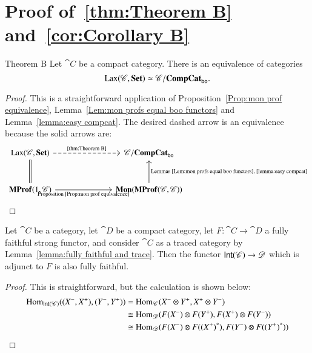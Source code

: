 \documentclass[12pt,oneside,article,draft]{memoir}
\begin{document}
\section{Proof of~\ref{thm:Theorem B} and~\ref{cor:Corollary B}}\label{sec:proof of Bs}

 \begin{named}{Theorem B}\label{thm:Theorem B}
 	Let $\cat{C}$ be a compact category. There is an equivalence of categories
  \[
    \operatorname{Lax}(\mathscr{C},\mathbf{Set})\simeq\mathscr{C}/\mathbf{CompCat}_{\mathsf{bo}}.
  \]
 \end{named}

\begin{proof}

This is a straightforward application of Proposition~\ref{Prop:mon prof equivalence}, Lemma~\ref{Lem:mon profs equal boo functors} and Lemma~\ref{lemma:easy compcat}. The desired dashed arrow is an equivalence because the solid arrows are:
$$
\begin{tikzcd}[column sep=2.5cm,row sep=1cm]
\Lax(\cat{C},\Set)\ar[d,equal]\ar[r,dashed,"\tn{\ref{thm:Theorem B}}"]&
\cat{C}/\CompCat_{\bo}\\
\MProf(1,\cat{C})\ar[r,"\tn{Proposition~\ref{Prop:mon prof equivalence}}"']&\Mon(\MProf(\cat{C},\cat{C}))\ar[u,"\tn{Lemmas~\ref{Lem:mon profs equal boo functors},~\ref{lemma:easy compcat}}"']
\end{tikzcd}
$$


\end{proof} 

\begin{lemma}\label{lemma:more fully faithfulness}
	Let $\cat{C}$ be a category, let $\cat{D}$ be a compact category, let $F\colon\cat{C}\to\cat{D}$ a fully faithful strong functor, and consider $\cat{C}$ as a traced category by Lemma~\ref{lemma:fully faithful and trace}. Then the functor $\mathsf{Int}(\mathscr{C})\to\mathscr{D}$ which is adjunct to $F$ is also fully faithful.
\end{lemma}

\begin{proof}
This is straightforward, but the calculation is shown below:
\begin{align*}
\operatorname{Hom}_{\mathsf{Int}(\mathscr{C})}((X^-,X^+),(Y^-,Y^+))&=\operatorname{Hom}_{\mathscr{C}}(X^-\otimes Y^+,X^+\otimes Y^-)\\
&\cong\operatorname{Hom}_{\mathscr{D}}(F(X^-)\otimes F(Y^+),F(X^+)\otimes F(Y^-))\\
&\cong\operatorname{Hom}_{\mathscr{D}}(F(X^-)\otimes F({(X^+)}^*),F(Y^-)\otimes F({(Y^+)}^*))
\end{align*}

\end{proof}
\end{document}
